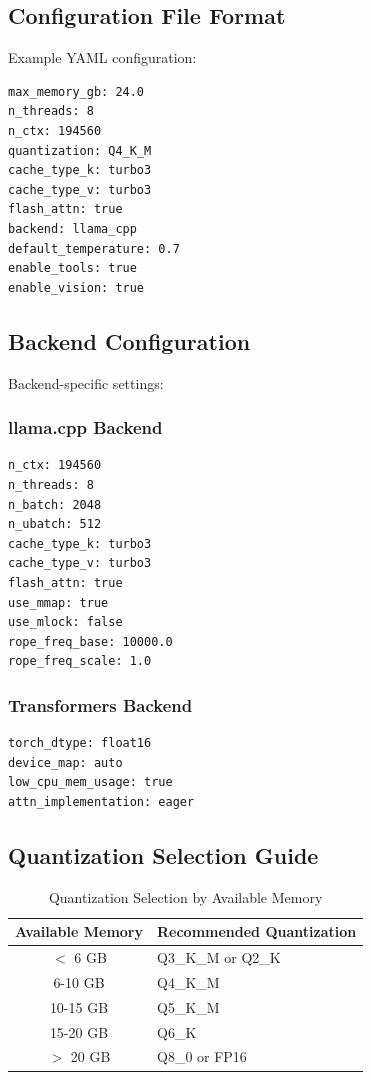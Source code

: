 \subsection{Configuration File Format}

Example YAML configuration:

\begin{verbatim}
max_memory_gb: 24.0
n_threads: 8
n_ctx: 194560
quantization: Q4_K_M
cache_type_k: turbo3
cache_type_v: turbo3
flash_attn: true
backend: llama_cpp
default_temperature: 0.7
enable_tools: true
enable_vision: true
\end{verbatim}

\subsection{Backend Configuration}

Backend-specific settings:

\subsubsection{llama.cpp Backend}

\begin{verbatim}
n_ctx: 194560
n_threads: 8
n_batch: 2048
n_ubatch: 512
cache_type_k: turbo3
cache_type_v: turbo3
flash_attn: true
use_mmap: true
use_mlock: false
rope_freq_base: 10000.0
rope_freq_scale: 1.0
\end{verbatim}

\subsubsection{Transformers Backend}

\begin{verbatim}
torch_dtype: float16
device_map: auto
low_cpu_mem_usage: true
attn_implementation: eager
\end{verbatim}

\subsection{Quantization Selection Guide}

\begin{table}[h]
\centering
\caption{Quantization Selection by Available Memory}
\label{tab:quant_selection}
\begin{tabular}{cl}
\toprule
\textbf{Available Memory} & \textbf{Recommended Quantization} \\
\midrule
$<$ 6 GB & Q3\_K\_M or Q2\_K \\
6-10 GB & Q4\_K\_M \\
10-15 GB & Q5\_K\_M \\
15-20 GB & Q6\_K \\
$>$ 20 GB & Q8\_0 or FP16 \\
\bottomrule
\end{tabular}
\end{table}

